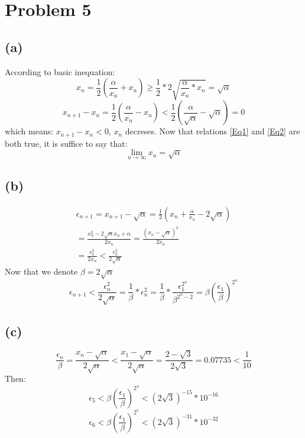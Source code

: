 \documentclass{article}
\begin{document}
\section*{Problem 5}
	\subsection*{(a)}
		\par According to basic inequation:
		\begin{equation}  \label{Eq2}
		x_n 
			= \frac{1}{2}(\frac{\alpha}{x_n} + x_n) 
			\geqslant \frac{1}{2}*2\sqrt{\frac{\alpha}{x_n} * x_n}
			= \sqrt{\alpha}
		\end{equation}
		\begin{equation} \label{Eq1}
		x_{n+1} - x_n 
			= \frac{1}{2}(\frac{\alpha}{x_n} - x_n) 
			< \frac{1}{2}(\frac{\alpha}{\sqrt{\alpha}} - \sqrt{\alpha})
			= 0
		\end{equation}
		which means: $ x_{n+1} - x_n < 0$, $x_n$ decreses.
		Now that relations \ref{Eq1} and \ref{Eq2} are both true, it is suffice to say that:
		$$ \lim_{n \to \infty} x_n = \sqrt{\alpha}$$
	\subsection*{(b)}
		\begin{equation} \begin{aligned}
			\epsilon_{n+1}
				= x_{n+1} - \sqrt{\alpha}
				= \frac{1}{2}(x_n + \frac{\alpha}{x_n} - 2\sqrt{\alpha}) \\
				= \frac{x_n^2 - 2\sqrt{\alpha}x_n+\alpha}{2x_n} 
				= \frac{(x_n - \sqrt{\alpha})^2}{2x_n} \\
				= \frac{\epsilon_n^2}{2x_n}
				< \frac{\epsilon_n^2}{2\sqrt{\alpha}}
		\end{aligned} \end{equation}
		Now that we denote $\beta = 2\sqrt{\alpha}$
		$$ \epsilon_{n+1} 
			< \frac{\epsilon_n^2}{2\sqrt{\alpha}}
			= \frac{1}{\beta}*\epsilon_n^2
			= \frac{1}{\beta}*\frac{\epsilon_1^{2^n}}{\beta^{2^n-2}}
			= \beta(\frac{\epsilon_1}{\beta})^{2^n}
		$$
	\subsection*{(c)}
		$$\frac{\epsilon_n}{\beta} 
			= \frac{x_n-\sqrt{\alpha}}{2\sqrt{\alpha}}
			< \frac{x_1-\sqrt{\alpha}}{2\sqrt{\alpha}}
			= \frac{2-\sqrt{3}}{2\sqrt{3}}
			= 0.07735 < \frac{1}{10}
		$$ 
		Then:
		$$\epsilon_5 
			< \beta(\frac{\epsilon_1}{\beta})^{2^4} 
			< (2\sqrt{3})^{-15} * 10^{-16}
		$$
		$$\epsilon_6 
			< \beta(\frac{\epsilon_1}{\beta})^{2^5}
			< (2\sqrt{3})^{-31} * 10^{-32}
		$$
\end{document}
